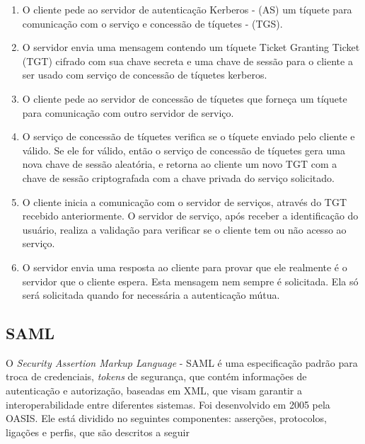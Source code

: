 \begin{enumerate}[1 )]
\item  O cliente pede ao servidor de autenticação Kerberos - (AS) um tíquete para comunicação com o serviço e concessão de tíquetes - (TGS).

\item O servidor envia uma mensagem contendo um tíquete Ticket Granting Ticket (TGT)  cifrado com sua chave secreta e uma chave de sessão para o cliente a ser usado com serviço de concessão de tíquetes kerberos.

\item O cliente pede ao servidor de concessão de tíquetes que forneça um tíquete para comunicação com outro servidor de serviço.

\item O serviço de concessão de tíquetes verifica se o tíquete enviado pelo cliente e válido. Se ele for válido, então o serviço de concessão de tíquetes gera uma nova chave de sessão aleatória, e retorna ao cliente um novo TGT com a chave de sessão criptografada com a chave privada do serviço solicitado.

\item O cliente inicia a comunicação com o servidor de serviços, através do TGT recebido anteriormente. O servidor de serviço, após receber a identificação do usuário, realiza a validação para verificar se o cliente tem ou não acesso ao serviço.

\item O servidor envia uma resposta ao cliente para provar que ele realmente é o servidor que o cliente espera. Esta mensagem nem sempre é solicitada. Ela só será solicitada quando for necessária a autenticação mútua.


\end{enumerate}




\subsection{SAML}

O \emph{Security Assertion Markup Language} - SAML é uma especificação padrão para troca de credenciais, \emph{tokens} de segurança, que contém informações de autenticação e autorização, baseadas em XML, que visam garantir a interoperabilidade entre diferentes sistemas. Foi desenvolvido em 2005 pela OASIS. Ele está dividido no seguintes componentes: asserções, protocolos, ligações e perfis, que são descritos a seguir~\cite{Madsen2005}

